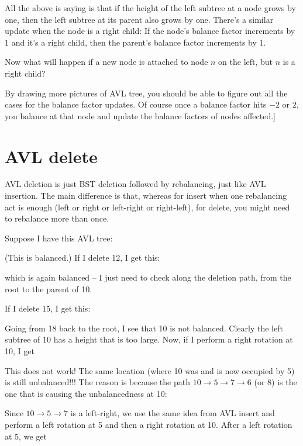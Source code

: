 All the above is saying is that if the height of the
left subtree at a node  grows by one, then the left subtree at its
parent also grows by one.
There's a similar update when the node is a right child:
If the node's balance factor increments by 1 and it's a right child,
then the parent's balance factor increments by 1.

Now what will happen if a new node is attached to node $n$ on the left,
but $n$ is a right child?

By drawing more pictures of AVL tree,
you should be able to figure out all the cases for the
balance factor updates. 
Of course once a balance factor hits $-2$ or $2$, you balance at that node
and update the balance factors of nodes affected.]


\newpage
\section{AVL delete}

AVL deletion is just BST deletion followed by rebalancing, just like AVL insertion.
The main difference is that, whereas for insert when one rebalancing act is enough
(left or right or left-right or right-left), for delete, you might need to rebalance
more than once.

Suppose I have this AVL tree:



(This is balanced.)
If I delete 12, I get this:



which is again balanced -- I just need to check along the deletion path, from the root to the
parent of 10.

If I delete 15, I get this:



Going from 18 back to the root, I see that 10 is not balanced. 
Clearly the left subtree of 10 has a height that is too large.
Now, if I perform a right rotation at 10, I get



This does not work!
The same location
(where 10 was and is now occupied by 5) is still unbalanced!!!
The reason is because the path $10\rightarrow 5\rightarrow 7\rightarrow 6$ (or $8$)
is the one that is causing the unbalancedness at 10:



Since $10\rightarrow 5 \rightarrow 7$ is a left-right, we use the same idea from AVL
insert
and perform a left rotation at 5 and then a right rotation at 10.
After a left rotation at 5, we get

